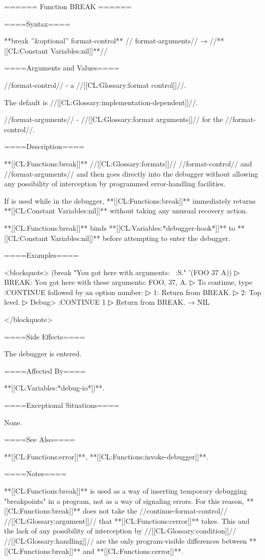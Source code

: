 ====== Function BREAK ======

====Syntax====

**break {''&optional'' format-control** //\rest} format-arguments// → //**[[CL:Constant Variables:nil]]**//

====Arguments and Values====

//format-control// - a //[[CL:Glossary:format control]]//.

The default is //[[CL:Glossary:implementation-dependent]]//.

//format-arguments// - //[[CL:Glossary:format arguments]]// for the //format-control//.

====Description====

**[[CL:Functions:break]]** //[[CL:Glossary:formats]]// //format-control// and //format-arguments// and then goes directly into the debugger without allowing any possibility of interception by programmed error-handling facilities.

If  is used while in the debugger, **[[CL:Functions:break]]** immediately returns **[[CL:Constant Variables:nil]]** without taking any unusual recovery action.

**[[CL:Functions:break]]** binds **[[CL:Variables:*debugger-hook*]]** to **[[CL:Constant Variables:nil]]** before attempting to enter the debugger.

====Examples====

<blockquote> (break "You got here with arguments: ~:S." '(FOO 37 A))
▷ BREAK: You got here with these arguments: FOO, 37, A.
▷ To continue, type :CONTINUE followed by an option number:
▷ 1: Return from BREAK.
▷ 2: Top level.
▷ Debug> :CONTINUE 1
▷ Return from BREAK. → NIL

</blockquote>

====Side Effects====

The debugger is entered.

====Affected By====

**[[CL:Variables:*debug-io*]]**.

====Exceptional Situations====

None.

====See Also====

**[[CL:Functions:error]]**, **[[CL:Functions:invoke-debugger]]**.

====Notes====

**[[CL:Functions:break]]** is used as a way of inserting temporary debugging "breakpoints" in a program, not as a way of signaling errors. For this reason, **[[CL:Functions:break]]** does not take the //continue-format-control// //[[CL:Glossary:argument]]// that **[[CL:Functions:cerror]]** takes. This and the lack of any possibility of interception by //[[CL:Glossary:condition]]// //[[CL:Glossary:handling]]// are the only program-visible differences between **[[CL:Functions:break]]** and **[[CL:Functions:cerror]]**.

